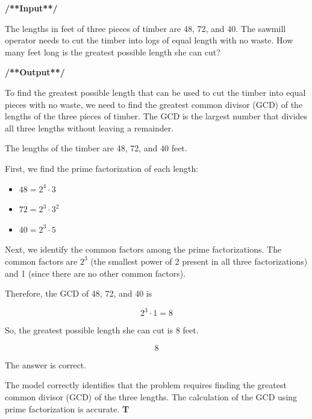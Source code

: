 \onecolumn
\begin{tcolorbox}[
    title=Training Data Format of \method: Correct Answer Trajectories,
    colback=white,
    colframe=black!75!white,
    breakable,
    boxrule=0.8pt,
    left=2mm,
    right=2mm,
    top=1mm,
    bottom=1mm
]
\label{box:training_data2}
\begin{spacing}{1.1}

\textbf{/**Input**/}  

The lengths in feet of three pieces of timber are 48, 72, and 40. The sawmill operator needs to cut the timber into logs of equal length with no waste. How many feet long is the greatest possible length she can cut?  

\textbf{/**Output**/}  

\textbf{\color{purple}{<answer>}}  

To find the greatest possible length that can be used to cut the timber into equal pieces with no waste, we need to find the greatest common divisor (GCD) of the lengths of the three pieces of timber. The GCD is the largest number that divides all three lengths without leaving a remainder.

The lengths of the timber are 48, 72, and 40 feet.

First, we find the prime factorization of each length:
\begin{itemize}[leftmargin=*, noitemsep, topsep=0pt]
    \item $48 = 2^4 \cdot 3$
    \item $72 = 2^3 \cdot 3^2$
    \item $40 = 2^3 \cdot 5$
\end{itemize}

Next, we identify the common factors among the prime factorizations. The common factors are $2^3$ (the smallest power of 2 present in all three factorizations) and 1 (since there are no other common factors).

Therefore, the GCD of 48, 72, and 40 is 

\[
2^3 \cdot 1 = 8
\]

So, the greatest possible length she can cut is 8 feet.

\[
\boxed{8}
\]

\textbf{\color{purple}{</answer>}}  


\textbf{\color{purple}{<critic>}} 

The answer is correct.

The model correctly identifies that the problem requires finding the greatest common divisor (GCD) of the three lengths. The calculation of the GCD using prime factorization is accurate.
\textbf{T}

\textbf{\color{purple}{</critic>}} 
\end{spacing}
\end{tcolorbox}
